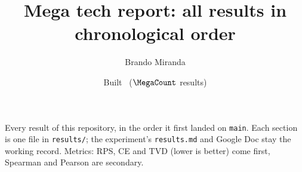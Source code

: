 \documentclass[11pt]{article}
\title{Mega tech report: all results in chronological order}
\author{Brando Miranda}
\date{Built \MegaBuilt\ ($\MegaCount$ results)}
\begin{document}
\maketitle
\noindent Every result of this repository, in the order it first landed on \texttt{main}. Each section is one file in
\texttt{results/}; the experiment's \texttt{results.md} and Google Doc stay the working record. Metrics: RPS, CE and TVD
(lower is better) come first, Spearman and Pearson are secondary.
\bigskip

\end{document}
